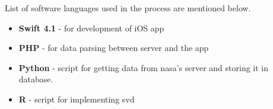 List of software languages used in the process are mentioned below.

\begin{itemize}
    \item \textbf{Swift 4.1} - for development of iOS app \\
    \item \textbf{PHP} - for data parsing between server and the app \\
    \item \textbf{Python} - script for getting data from \gls{nasa}'s server and storing it in database. \\
    \item \textbf{R} - script for implementing \gls{svd} \\
\end{itemize}
